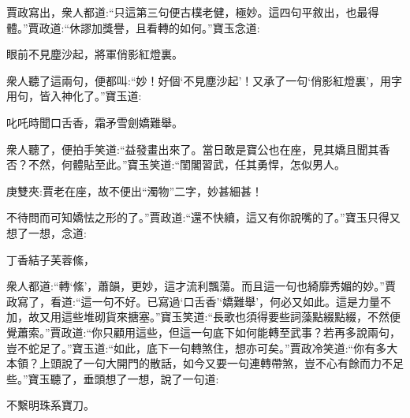 \begin{parag}
    賈政寫出，衆人都道:“只這第三句便古樸老健，極妙。這四句平敘出，也最得體。”賈政道:“休謬加獎譽，且看轉的如何。”寶玉念道:
\end{parag}


\begin{poem}
    \begin{pl}眼前不見塵沙起，將軍俏影紅燈裏。\end{pl}

\end{poem}


\begin{parag}
    衆人聽了這兩句，便都叫:“妙！好個‘不見塵沙起’！又承了一句‘俏影紅燈裏’，用字用句，皆入神化了。”寶玉道:
\end{parag}


\begin{poem}
    \begin{pl}叱吒時聞口舌香，霜矛雪劍嬌難舉。\end{pl}
\end{poem}


\begin{parag}
    衆人聽了，便拍手笑道:“益發畫出來了。當日敢是寶公也在座，見其嬌且聞其香否？不然，何體貼至此。”寶玉笑道:“閨閣習武，任其勇悍，怎似男人。\begin{note}庚雙夾:賈老在座，故不便出“濁物”二字，妙甚細甚！\end{note}不待問而可知嬌怯之形的了。”賈政道:“還不快續，這又有你說嘴的了。”寶玉只得又想了一想，念道:
\end{parag}


\begin{poem}
    \begin{pl}丁香結子芙蓉絛，\end{pl}
\end{poem}


\begin{parag}
    衆人都道:“轉‘絛’，蕭韻，更妙，這才流利飄蕩。而且這一句也綺靡秀媚的妙。”賈政寫了，看道:“這一句不好。已寫過‘口舌香’‘嬌難舉’，何必又如此。這是力量不加，故又用這些堆砌貨來搪塞。”寶玉笑道:“長歌也須得要些詞藻點綴點綴，不然便覺蕭索。”賈政道:“你只顧用這些，但這一句底下如何能轉至武事？若再多說兩句，豈不蛇足了。”寶玉道:“如此，底下一句轉煞住，想亦可矣。”賈政冷笑道:“你有多大本領？上頭說了一句大開門的散話，如今又要一句連轉帶煞，豈不心有餘而力不足些。”寶玉聽了，垂頭想了一想，說了一句道:
\end{parag}


\begin{poem}
    \begin{pl}不繫明珠系寶刀。\end{pl}
\end{poem}


